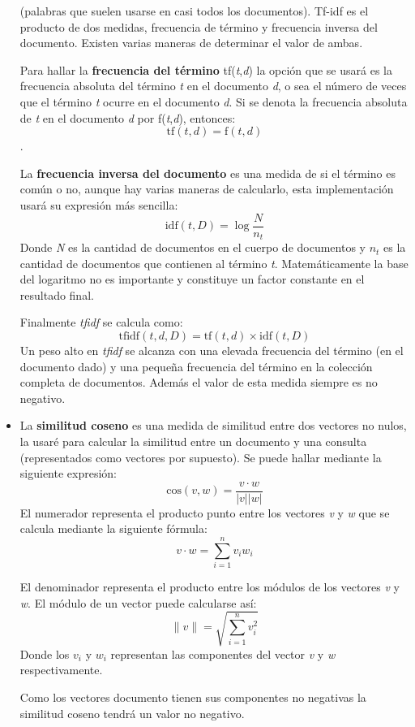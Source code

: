 \documentclass{article}
\begin{document}
\begin{itemize}
(palabras que suelen usarse en casi todos los documentos). Tf-idf es el producto de dos medidas, frecuencia de término y frecuencia inversa del documento. Existen varias maneras de determinar el valor de ambas. 

Para hallar la \textbf{frecuencia del término} tf(\textit{t},\textit{d}) la opción que se usará es la frecuencia absoluta del término \textit{t} en el documento \textit{d}, o sea el número de veces que el término \textit{t} ocurre en el documento \textit{d}. Si se denota la frecuencia absoluta de \textit{t} en el documento \textit{d} por f(\textit{t},\textit{d}), entonces:
\begin{equation}
\text{tf}(t,d) = \text{f}(t,d) 
\end{equation}.

La \textbf{frecuencia inversa del documento} es una medida de si el término es común o no, aunque hay varias maneras de calcularlo, esta implementación usará su expresión más sencilla:
\begin{equation}
\text{idf}(t,D) = \log \frac{N}{n_t} 
\end{equation}
Donde \textit{N} es la cantidad de documentos en el cuerpo de documentos y \textit{$n_t$} es la cantidad de documentos que contienen al término \textit{t}. Matemáticamente la base del logaritmo no es importante y constituye un factor constante en el resultado final.

Finalmente \textit{tfidf} se calcula como:
\begin{equation}
\text{tfidf}(t,d,D) = \text{tf}(t,d) \times \text{idf}(t,D) 
\end{equation} 
Un peso alto en \textit{tfidf} se alcanza con una elevada frecuencia del término (en el documento dado) y una pequeña frecuencia del término en la colección completa de documentos. Además el valor de esta medida siempre es no negativo.
\item La \textbf{similitud coseno} es una medida de similitud entre dos vectores no nulos, la usaré para calcular la similitud entre un documento y una consulta (representados como vectores por supuesto). Se puede hallar mediante la siguiente expresión:
\begin{equation}
 \text{cos}(v,w) = \frac{v \cdot w}{|v| |w|} 
\end{equation}
El numerador representa el producto punto entre los vectores \textit{v} y \textit{w} que se calcula mediante la siguiente fórmula:
\begin{equation}
v \cdot w = \sum_{i=1}^n v_i w_i
\end{equation} 
 
El denominador representa el producto entre los módulos de los vectores \textit{v} y \textit{w}. El módulo de un vector puede calcularse así:
\begin{equation}
\|v\| = \sqrt{\sum_{i=1}^n v_i^2}
\end{equation}
Donde los $v_{i}$ y $w_i$ representan las componentes del vector \textit{v} y \textit{w} respectivamente.

Como los vectores documento tienen sus componentes no negativas la similitud coseno tendrá un valor no negativo. 
\end{itemize}  
\end{document}
